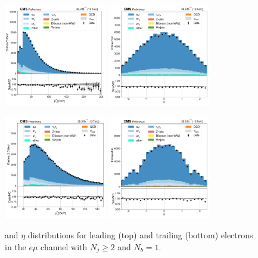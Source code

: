 \begin{figure}[htb!]
    \centering
    \includegraphics[width=0.4\textwidth]{chapters/Appendix/sectionPlots/figures/data_mc_overlays/emu_2016_cat_gt2_eq1_a_signal_linear_lepton_lepton1_pt}
    \includegraphics[width=0.4\textwidth]{chapters/Appendix/sectionPlots/figures/data_mc_overlays/emu_2016_cat_gt2_eq1_a_signal_linear_lepton_lepton1_eta}

    \includegraphics[width=0.4\textwidth]{chapters/Appendix/sectionPlots/figures/data_mc_overlays/emu_2016_cat_gt2_eq1_a_signal_linear_lepton_lepton2_pt}
    \includegraphics[width=0.4\textwidth]{chapters/Appendix/sectionPlots/figures/data_mc_overlays/emu_2016_cat_gt2_eq1_a_signal_linear_lepton_lepton2_eta}
    \caption{\pt and $\eta$ distributions for leading (top) and trailing
        (bottom) electrons in the $e\mu$ channel with $N_{j} \geq 2$ and
        $N_{b} = 1$.}
    \label{fig:emu_5_kinematic}
\end{figure}

